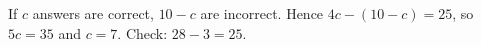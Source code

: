 If $c$ answers are correct, $10-c$ are incorrect. Hence $4c-(10-c)=25$, so $5c=35$ and $\boxed{c=7}$. Check: $28-3=25$.
